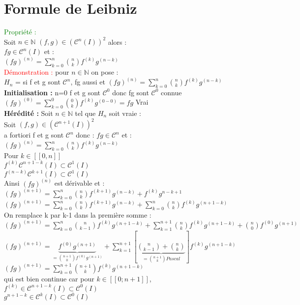 \documentclass{article}
\begin{document}
\section{Formule de Leibniz}
\textcolor{green}{Propriété :} \\ 
Soit $n \in \mathbb{N}$ $(f,g) \in (\mathcal{C}^n(I))^2$ alors : \\ 
$fg \in \mathcal{C}^n(I)$ et : \\ 
$(fg)^{(n)}= \sum_{k=0}^n \binom{n}{k} f^{(k)} g^{(n-k)}$ \\ 
\textcolor{red}{Démonstration :} pour $n \in \mathbb{N}$ on pose : \\ 
$H_n$ = si f et g sont $\mathcal{C}^n$, fg aussi et $(fg)^{(n)}= \sum_{k=0}^n \binom{n}{k} f^{(k)} g^{(n-k)}$ \\ 
{\bf Initialisation  :} n=0 f et g sont $\mathcal{C}^0$ donc fg sont $\mathcal{C}^0$ connue \\ 
$(fg)^{(0)}= \sum_{k=0}^0 \binom{0}{k} f^{(k)} g^{(0-0)}=fg$ Vrai  \\ 
{\bf Hérédité :} Soit $n \in \mathbb{N}$ tel que $H_n$ soit vraie : \\ 
Soit $(f,g) \in (\mathcal{C}^{n+1}(I))^2$ \\ 
a fortiori f et g sont $\mathcal{C}^{n}$ donc : $fg \in \mathcal{C}^{n}$ et : \\ 
$(fg)^{(n)}= \sum_{k=0}^n \binom{n}{k} f^{(k)} g^{(n-k)}$ \\ 
Pour $k \in [[0,n]]$ \\ 
$f^{(k)}\mathcal{C}^{n+1-k}(I) \subset \mathcal{C}^{1}(I)$ \\ 
$f^{(n-k)}\mathcal{C}^{k+1}(I) \subset \mathcal{C}^{1}(I)$ \\ 
Ainsi $(fg)^{(n)}$ est dérivable et : \\ 
$(fg)^{(n+1)}= \sum_{k=0}^n \binom{n}{k} f^{(k+1)} g^{(n-k)}+f^{(k)}g^{n-k+1}$
$(fg)^{(n+1)}= \sum_{k=0}^n \binom{n}{k} f^{(k+1)} g^{(n-k)}+ \sum_{k=0}^n \binom{n}{k} f^{(k)}g^{(n+1-k)}$ \\ 
On remplace k par k-1 dans la première somme : \\ 
$(fg)^{(n+1)}= \sum_{k=0}^n \binom{n}{k-1} f^{(k)} g^{(n+1-k)}+ \sum_{k=1}^{n+1} \binom{n}{k} f^{(k)}g^{(n+1-k)}+ \binom{n}{0} f^{(0)}g^{(n+1)}$ \\ 
$(fg)^{(n+1)}= \underbrace{f^{(0)}g^{(n+1)}}_{=\binom{n+1}{0}{f^{(0)}g^{(n+1)}}}+  \sum_{k=1}^{n+1} [ \underbrace{\binom{n}{k-1}+\binom{n}{k}}_{=\binom{n+1}{k} Pascal} ] f^{(k)}g^{(n+1-k)}$ \\ 
$(fg)^{(n+1)}=\sum_{k=0}^{n+1} \binom{n+1}{k} f^{(k)} g^{(n+1-k)}$ \\ 
qui est bien continue car pour $k \in [[0;n+1]]$, \\ 
$f^{(k)} \in \mathcal{C}^{n+1-k}(I) \subset \mathcal{C}^{0}(I)$ \\ 
$g^{n+1-k} \in \mathcal{C}^{k}(I) \subset \mathcal{C}^{0}(I)$
\end{document}
